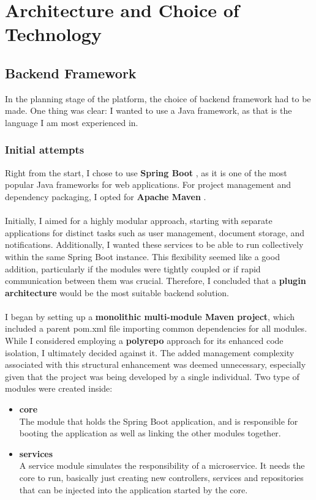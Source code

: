 \chapter{Architecture and Choice of Technology}
\section{Backend Framework}

In the planning stage of the platform, the choice of backend framework had to be made. One thing was clear: I wanted to use a Java framework, as that is the language I am most experienced in.

\subsection{Initial attempts}

\noindent Right from the start, I chose to use \textbf{Spring Boot} \cite{springboot}, as it is one of the most popular Java frameworks for web applications. For project management and dependency packaging, I opted for \textbf{Apache Maven} \cite{apache-maven}.
\\\\
\noindent Initially, I aimed for a highly modular approach, starting with separate applications for distinct tasks such as user management, document storage, and notifications. Additionally, I wanted these services to be able to run collectively within the same Spring Boot instance. This flexibility seemed like a good addition, particularly if the modules were tightly coupled or if rapid communication between them was crucial. Therefore, I concluded that a \textbf{plugin architecture} would be the most suitable backend solution.
\\\\
\noindent I began by setting up a \textbf{monolithic multi-module Maven project}, which included a parent pom.xml file importing common dependencies for all modules. While I considered employing a \textbf{polyrepo} approach for its enhanced code isolation, I ultimately decided against it. The added management complexity associated with this structural enhancement was deemed unnecessary, especially given that the project was being developed by a single individual.
\newpage 
\noindent Two type of modules were created inside:
\begin{itemize}
    \item \textbf{core} \\
    The module that holds the Spring Boot application, and is responsible for booting the application as well as linking the other modules together.

    \item \textbf{services} \\
    A service module simulates the responsibility of a microservice. It needs the core to run, basically just creating new controllers, services and repositories that can be injected into the application started by the core.
\end{itemize}

